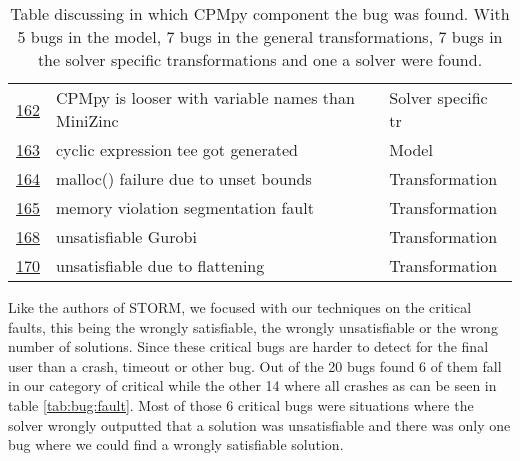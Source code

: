\begin{table}[]
\begin{tabular}{lll}
		\href{https://github.com/CPMpy/cpmpy/issues/162}{162} & CPMpy is looser with variable names than MiniZinc & Solver specific tr \\
		\href{https://github.com/CPMpy/cpmpy/issues/163}{163} & cyclic expression tee got generated               & Model              \\
		\href{https://github.com/CPMpy/cpmpy/issues/164}{164} & malloc() failure due to unset bounds              & Transformation     \\
		\href{https://github.com/CPMpy/cpmpy/issues/165}{165} & memory violation segmentation fault               & Transformation     \\
		\href{https://github.com/CPMpy/cpmpy/issues/168}{168} & unsatisfiable Gurobi                              & Transformation     \\
		\href{https://github.com/CPMpy/cpmpy/issues/170}{170} & unsatisfiable due to flattening                   & Transformation     \\ \bottomrule        
	\end{tabular}
	\caption{Table discussing in which CPMpy component the bug was found. With 5 bugs in the model, 7 bugs in the general transformations, 7 bugs in the solver specific transformations and one a solver were found.}
	\label{tab:bug:placeComponent}
\end{table}

Like the authors of STORM, we focused with our techniques on the critical faults, this being the wrongly satisfiable, the wrongly unsatisfiable or the wrong number of solutions. Since these critical bugs are harder to detect for the final user than a crash, timeout or other bug. Out of the 20 bugs found 6 of them fall in our category of critical while the other 14 where all crashes as can be seen in table \ref{tab:bug:fault}. Most of those 6 critical bugs were situations where the solver wrongly outputted that a solution was unsatisfiable and there was only one bug where we could find a wrongly satisfiable solution.

